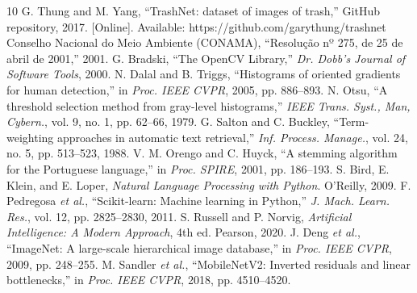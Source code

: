 \documentclass[conference]{IEEEtran}
\begin{document}
\begin{thebibliography}{10}
 G. Thung and M. Yang, ``TrashNet: dataset of images of trash,'' GitHub repository, 2017. [Online]. Available: https://github.com/garythung/trashnet
 Conselho Nacional do Meio Ambiente (CONAMA), ``Resolução nº 275, de 25 de abril de 2001,'' 2001.
 G. Bradski, ``The OpenCV Library,'' \emph{Dr. Dobb's Journal of Software Tools}, 2000.
 N. Dalal and B. Triggs, ``Histograms of oriented gradients for human detection,'' in \emph{Proc. IEEE CVPR}, 2005, pp. 886--893.
 N. Otsu, ``A threshold selection method from gray-level histograms,'' \emph{IEEE Trans. Syst., Man, Cybern.}, vol. 9, no. 1, pp. 62--66, 1979.
 G. Salton and C. Buckley, ``Term-weighting approaches in automatic text retrieval,'' \emph{Inf. Process. Manage.}, vol. 24, no. 5, pp. 513--523, 1988.
 V. M. Orengo and C. Huyck, ``A stemming algorithm for the Portuguese language,'' in \emph{Proc. SPIRE}, 2001, pp. 186--193.
 S. Bird, E. Klein, and E. Loper, \emph{Natural Language Processing with Python}. O'Reilly, 2009.
 F. Pedregosa \emph{et al.}, ``Scikit-learn: Machine learning in Python,'' \emph{J. Mach. Learn. Res.}, vol. 12, pp. 2825--2830, 2011.
 S. Russell and P. Norvig, \emph{Artificial Intelligence: A Modern Approach}, 4th ed. Pearson, 2020.
 J. Deng \emph{et al.}, ``ImageNet: A large-scale hierarchical image database,'' in \emph{Proc. IEEE CVPR}, 2009, pp. 248--255.
 M. Sandler \emph{et al.}, ``MobileNetV2: Inverted residuals and linear bottlenecks,'' in \emph{Proc. IEEE CVPR}, 2018, pp. 4510--4520.
\end{thebibliography}
\end{document}
